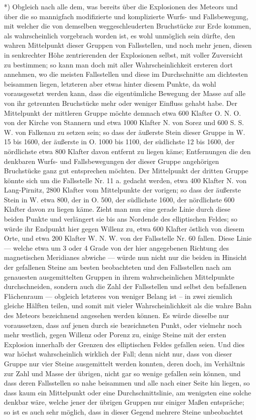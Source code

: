 \documentclass[a4paper, 11pt, oneside, german]{article}
\begin{document}
*) Obgleich nach alle dem, was bereits über die Explosionen des Meteors und über die so mannigfach modifizierte und komplizierte Wurfs- und Fallsbewegung, mit welcher die von demselben weggeschleuderten Bruchstücke zur Erde kommen, als wahrscheinlich vorgebrach worden ist, es wohl unmöglich sein dürfte, den wahren Mittelpunkt dieser Gruppen von Fallsstellen, und noch mehr jenen, diesen in senkrechter Höhe zentrierenden der Explosionen selbst, mit voller Zuversicht zu bestimmen; so kann man doch mit aller Wahrscheinlichkeit ersteren dort annehmen, wo die meisten Fallsstellen und diese im Durchschnitte am dichtesten beisammen liegen, letzteren aber etwas hinter diesem Punkte, da wohl vorausgesetzt werden kann, dass die eigentümliche Bewegung der Masse auf alle von ihr getrennten Bruchstücke mehr oder weniger Einfluss gehabt habe. Der Mittelpunkt der mittleren Gruppe möchte demnach etwa 600 Klafter O. N. O. von der Kirche von Stannern und etwa 1000 Klafter N. von Sorez und 600 S. S. W. von Falkenau zu setzen sein; so dass der äußerste Stein dieser Gruppe in W. 15 bis 1600, der äußerste in O. 1000 bis 1100, der südlichste 12 bis 1600, der nördlichste etwa 800 Klafter davon entfernt zu liegen käme; Entfernungen die den denkbaren Wurfs- und Fallsbewegungen der dieser Gruppe angehörigen Bruchstücke ganz gut entsprechen möchten. Der Mittelpunkt der dritten Gruppe könnte sich um die Fallsstelle Nr. 11 a. gedacht werden, etwa 400 Klafter N. von Lang-Pirnitz, 2800 Klafter vom Mittelpunkte der vorigen; so dass der äußerste Stein in W. etwa 800, der in O. 500, der südlichste 1600, der nördlichste 600 Klafter davon zu liegen käme. Zieht man nun eine gerade Linie durch diese beiden Punkte und verlängert sie bis ans Nordende des elliptischen Feldes; so würde ihr Endpunkt hier gegen Willenz zu, etwa 600 Klafter östlich von diesem Orte, und etwa 200 Klafter W. N. W. von der Fallsstelle Nr. 60 fallen. Diese Linie --- welche etwa um 3 oder 4 Grade von der hier angegebenen Richtung des magnetischen Meridianes abwiche --- würde nun nicht nur die beiden in Hinsicht der gefallenen Steine am besten beobachteten und den Fallsstellen nach am genauesten ausgemittelten Gruppen in ihrem wahrscheinlichen Mittelpunkte durchschneiden, sondern auch die Zahl der Fallsstellen und selbst den befallenen Flächenraum --- obgleich letzteres von weniger Belang ist -- in zwei ziemlich gleiche Hälften teilen, und somit mit vieler Wahrscheinlichkeit als die wahre Bahn des Meteors bezeichnend angesehen werden können. Es würde dieselbe nur voraussetzen, dass auf jenen durch sie bezeichneten Punkt, oder vielmehr noch mehr westlich, gegen Willenz oder Porenz zu, einige Steine mit der ersten Explosion innerhalb der Grenzen des elliptischen Feldes gefallen seien. Und dies war höchst wahrscheinlich wirklich der Fall; denn nicht nur, dass von dieser Gruppe nur vier Steine ausgemittelt werden konnten, deren doch, im Verhältnis zur Zahl und Masse der übrigen, nicht gar so wenige gefallen sein können, und dass deren Fallsstellen so nahe beisammen und alle nach einer Seite hin liegen, so dass kaum ein Mittelpunkt oder eine Durchschnittslinie, am wenigsten eine solche denkbar wäre, welche jener der übrigen Gruppen nur einiger Maßen entspräche; so ist es auch sehr möglich, dass in dieser Gegend mehrere Steine unbeobachtet 
\end{document}

